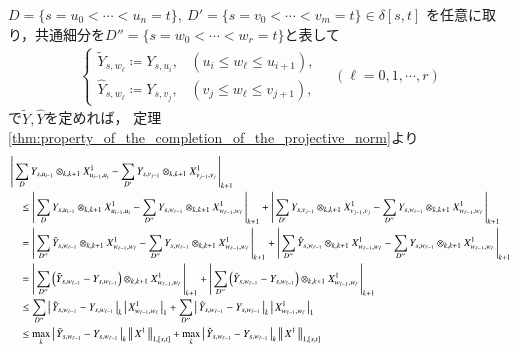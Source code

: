 	\begin{prf}
		$D=\{s=u_0 < \cdots <u_n= t\},\ D'=\{s=v_0 < \cdots <v_m= t\} \in \delta[s,t]$
		を任意に取り，共通細分を$D''=\{s=w_0 < \cdots < w_r = t\}$と表して
		\begin{align}
			\begin{cases}
				\tilde{Y}_{s,w_\ell} \coloneqq Y_{s,u_i}, & (u_i \leq w_\ell \leq u_{i+1}), \\
				\hat{Y}_{s,w_\ell} \coloneqq Y_{s,v_j}, & (v_j \leq w_\ell \leq v_{j+1}),
			\end{cases}
			\quad (\ell=0,1,\cdots,r)
		\end{align}
		で$\tilde{Y},\hat{Y}$を定めれば，
		定理\ref{thm:property_of_the_completion_of_the_projective_norm}より
		\begin{align}
			&\compcrossnorm{ \sum_D Y_{s,u_{i-1}} \otimes_{k,k+1} X^1_{u_{i-1},u_i} - 
				\sum_{D'} Y_{s,v_{j-1}} \otimes_{k,k+1} X^1_{v_{j-1},v_j}}{k+1} \\
			&\quad\leq \compcrossnorm{ \sum_D Y_{s,u_{i-1}} \otimes_{k,k+1} X^1_{u_{i-1},u_i} - 
				\sum_{D''} Y_{s,w_{\ell-1}} \otimes_{k,k+1} X^1_{w_{\ell-1},w_\ell}}{k+1}
				+ \compcrossnorm{ \sum_{D'} Y_{s,v_{j-1}} \otimes_{k,k+1} X^1_{v_{j-1},v_j} - 
				\sum_{D''} Y_{s,w_{\ell-1}} \otimes_{k,k+1} X^1_{w_{\ell-1},w_\ell}}{k+1} \\
			&\quad= \compcrossnorm{ \sum_{D''} \tilde{Y}_{s,w_{\ell-1}} \otimes_{k,k+1} X^1_{w_{\ell-1},w_\ell} - 
				\sum_{D''} Y_{s,w_{\ell-1}} \otimes_{k,k+1} X^1_{w_{\ell-1},w_\ell}}{k+1} 
				+ \compcrossnorm{ \sum_{D''} \hat{Y}_{s,w_{\ell-1}} \otimes_{k,k+1} X^1_{w_{\ell-1},w_\ell} - 
				\sum_{D''} Y_{s,w_{\ell-1}} \otimes_{k,k+1} X^1_{w_{\ell-1},w_\ell}}{k+1} \\
			&\quad= \compcrossnorm{ \sum_{D''} \left(\tilde{Y}_{s,w_{\ell-1}} - Y_{s,w_{\ell-1}} \right)
		 		\otimes_{k,k+1} X^1_{w_{\ell-1},w_\ell}}{k+1}
				+ \compcrossnorm{ \sum_{D''} \left( \hat{Y}_{s,w_{\ell-1}} - Y_{s,w_{\ell-1}} \right)
				\otimes_{k,k+1} X^1_{w_{\ell-1},w_\ell}}{k+1} \\
			&\quad\leq \sum_{D''} \compcrossnorm{\tilde{Y}_{s,w_{\ell-1}} - Y_{s,w_{\ell-1}}}{k} \compcrossnorm{X^1_{w_{\ell-1},w_\ell}}{1}
				+ \sum_{D''} \compcrossnorm{\hat{Y}_{s,w_{\ell-1}} - Y_{s,w_{\ell-1}}}{k} \compcrossnorm{X^1_{w_{\ell-1},w_\ell}}{1} \\
			&\quad\leq \max{k}{\compcrossnorm{\tilde{Y}_{s,w_{\ell-1}} - Y_{s,w_{\ell-1}}}{k}} 
				\Norm{X^1}{1,[s,t]} + \max{k}{\compcrossnorm{\hat{Y}_{s,w_{\ell-1}} - Y_{s,w_{\ell-1}}}{k}} \Norm{X^1}{1,[s,t]}

\end{align}
\end{prf}
